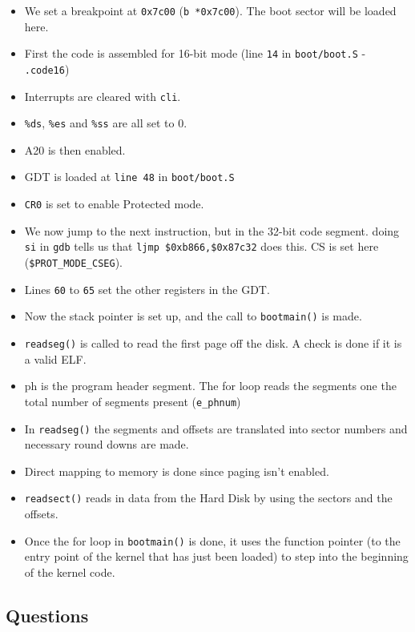 \documentclass[]{article}
\begin{document}
\begin{itemize}
\itemsep1pt\parskip0pt
\item
  We set a breakpoint at \texttt{0x7c00} (\texttt{b *0x7c00}). The boot
  sector will be loaded here.
\item
  First the code is assembled for 16-bit mode (line \texttt{14} in
  \texttt{boot/boot.S} - \texttt{.code16})
\item
  Interrupts are cleared with \texttt{cli}.
\item
  \texttt{\%ds}, \texttt{\%es} and \texttt{\%ss} are all set to 0.
\item
  A20 is then enabled.
\item
  GDT is loaded at \texttt{line 48} in \texttt{boot/boot.S}
\item
  \texttt{CR0} is set to enable Protected mode.
\item
  We now jump to the next instruction, but in the 32-bit code segment.
  doing \texttt{si} in \texttt{gdb} tells us that
  \texttt{ljmp \$0xb866,\$0x87c32} does this. CS is set here
  (\texttt{\$PROT\_MODE\_CSEG}).
\item
  Lines \texttt{60} to \texttt{65} set the other registers in the GDT.
\item
  Now the stack pointer is set up, and the call to \texttt{bootmain()}
  is made.
\item
  \texttt{readseg()} is called to read the first page off the disk. A
  check is done if it is a valid ELF.
\item
  ph is the program header segment. The for loop reads the segments one
  the total number of segments present (\texttt{e\_phnum})
\item
  In \texttt{readseg()} the segments and offsets are translated into
  sector numbers and necessary round downs are made.
\item
  Direct mapping to memory is done since paging isn't enabled.
\item
  \texttt{readsect()} reads in data from the Hard Disk by using the
  sectors and the offsets.
\item
  Once the for loop in \texttt{bootmain()} is done, it uses the function
  pointer (to the entry point of the kernel that has just been loaded)
  to step into the beginning of the kernel code.
\end{itemize}

\subsection{Questions}
\end{document}
